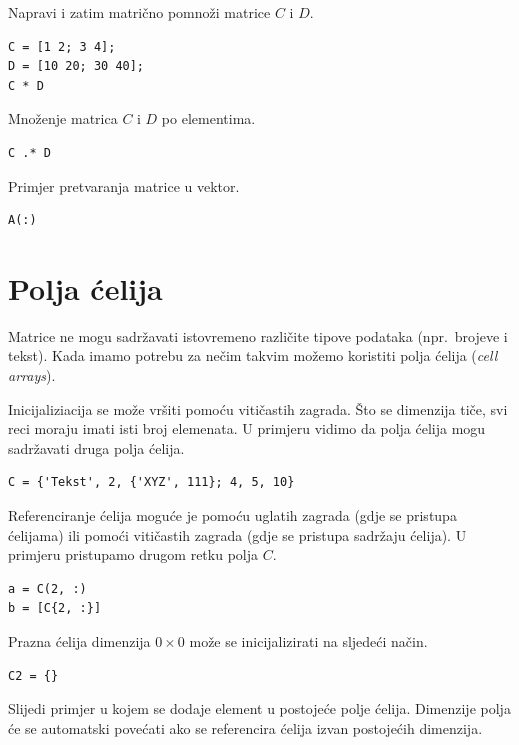\documentclass[a4paper, 10pt]{article}
\begin{document}
Napravi i zatim matrično pomnoži matrice $C$ i $D$.

\begin{lstlisting}
C = [1 2; 3 4];
D = [10 20; 30 40];
C * D
\end{lstlisting}

Množenje matrica $C$ i $D$ po elementima.

\begin{lstlisting}
C .* D
\end{lstlisting}

Primjer pretvaranja matrice u vektor.

\begin{lstlisting}
A(:)
\end{lstlisting}


\section{Polja ćelija}

Matrice ne mogu sadržavati istovremeno različite tipove podataka (npr.\ brojeve i tekst). Kada imamo potrebu za nečim takvim možemo koristiti polja ćelija (\emph{cell arrays}).

Inicijaliziacija se može vršiti pomoću vitičastih zagrada. Što se dimenzija tiče, svi reci moraju imati isti broj elemenata. U primjeru vidimo da polja ćelija mogu sadržavati druga polja ćelija.

\begin{lstlisting}
C = {'Tekst', 2, {'XYZ', 111}; 4, 5, 10}
\end{lstlisting}

Referenciranje ćelija moguće je pomoću uglatih zagrada (gdje se pristupa ćelijama) ili pomoći vitičastih zagrada (gdje se pristupa sadržaju ćelija). U primjeru pristupamo drugom retku polja $C$. 

\begin{lstlisting}
a = C(2, :)
b = [C{2, :}]
\end{lstlisting}

Prazna ćelija dimenzija $0 \times 0$ može se inicijalizirati na sljedeći način.

\begin{lstlisting}
C2 = {}
\end{lstlisting}

Slijedi primjer u kojem se dodaje element u postojeće polje ćelija. Dimenzije polja će se automatski povećati ako se referencira ćelija izvan postojećih dimenzija.
\end{document}
